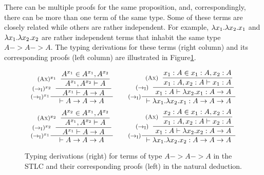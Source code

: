 There can be multiple proofs for the same proposition, and,
correspondingly, there can be more than one term of the same type.
Some of these terms are closely related while others are rather independent.
For example, $\lambda x_1.\lambda x_2.x_1$ and $\lambda x_1.\lambda x_2.x_2$ are rather 
independent terms that inhabit the same type $A -> A -> A$.
The typing derivations for these terms (right column) and
its corresponding proofs (left column) are illustrated in
Figure\;\ref{fig:proofAAA}.
\begin{figure}
\[\setpremisesend{.1em}
\inference[$(->_\textsc{I})^{x_1}$]
        {\hspace*{-3em}
         \inference[$(->_\textsc{I})^{x_2}$]
                {\hspace*{-3em}
                 \inference[$(\textsc{Ax})^{x_1}$]
                        {A^{x_1}\in A^{x_1},A^{x_2}}
                        {A^{x_1},A^{x_2} |- A} }
                {A^{x_1} |- A -> A} }
        {|- A -> A -> A }
\qquad
\inference[($->_\textsc{I}$)]
        {\hspace*{-1.3em}
         \inference[($->_\textsc{I}$)]
                {\hspace*{-1.5em}
                 \inference[(\textsc{Ax})]
                        {x_1 : A \in x_1 : A, x_2 : A}
                        {x_1 : A, x_2 : A |- x_1 : A} }
                {x_1 : A |- \l x_2.x_1 : A -> A} }
        {|- \l x_1.\l x_2.x_1 : A -> A -> A }
\]
\[\setpremisesend{.1em}
\inference[$(->_\textsc{I})^{x_1}$]
        {\hspace*{-3em}
         \inference[$(->_\textsc{I})^{x_2}$]
                {\hspace*{-3em}
                 \inference[$(\textsc{Ax})^{x_2}$]
                        {A^{x_2}\in A^{x_1},A^{x_2}}
                        {A^{x_1},A^{x_2} |- A} }
                {A^{x_1} |- A -> A} }
        {|- A -> A -> A }
\qquad
\inference[($->_\textsc{I}$)]
        {\hspace*{-1.3em}
         \inference[($->_\textsc{I}$)]
                {\hspace*{-1.5em}
                 \inference[(\textsc{Ax})]
                        {x_2 : A \in x_1 : A, x_2 : A}
                        {x_1 : A, x_2 : A |- x_2 : A} }
                {x_1 : A |- \l x_2.x_2 : A -> A} }
        {|- \l x_1.\l x_2.x_2 : A -> A -> A }
\]
\caption{Typing derivations (right) for terms of type $A -> A -> A$
	 in the STLC and their corresponding proofs (left) in
         the natural deduction.}
\label{fig:proofAAA}
\end{figure}

